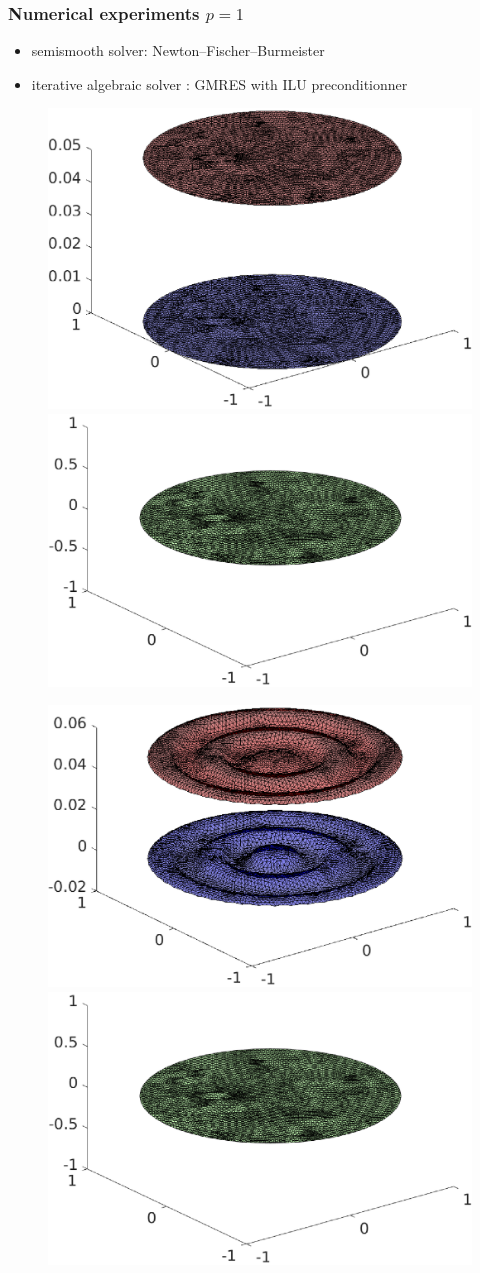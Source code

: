 \begin{frame}
\frametitle{Numerical experiments $p=1$}
\begin{itemize}
\item semismooth solver: Newton--Fischer--Burmeister
\item iterative algebraic solver : GMRES with ILU preconditionner
\end{itemize}
\begin{overprint}
\begin{figure}
\includegraphics[width=0.48 \textwidth]{fig_article_chap_2/test_case_128/fig_u1u2_hmax0,09_Dt0,001_tt00.eps} 
\quad
\includegraphics[width=0.48 \textwidth]{fig_article_chap_2/test_case_128/fig_lambda_hmax0,09_Dt0,001_tt02.eps} 
\end{figure}
\begin{figure}
\includegraphics[width=0.48 \textwidth]{fig_article_chap_2/test_case_128/fig_u1u2_hmax0,09_Dt0,001_tt01.eps} 
\quad
\includegraphics[width=0.48 \textwidth]{fig_article_chap_2/test_case_128/fig_lambda_hmax0,09_Dt0,001_tt02.eps} 

\end{figure}
\end{overprint}
\end{frame}
